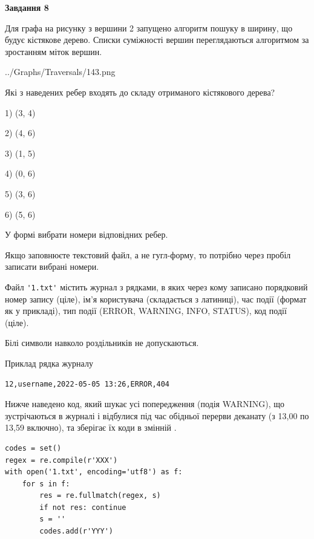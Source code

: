 \documentclass[12pt, ukrainian]{article}
\def\code#1{\Verb!#1!}
\begin{document}
{\begin {large}
{\begin {center}\textbf{Завдання 8}\end {center}}\par
Для графа на рисунку з вершини 2 запущено алгоритм пошуку в ширину, що будує кістякове дерево. Списки суміжності вершин переглядаються алгоритмом за зростанням міток вершин.\par
\begin{center}
	{../Graphs/Traversals/143.png}
\end{center}
\par Які з наведених ребер входять до складу отриманого кістякового дерева?\par
1) (3, 4)\par
2) (4, 6)\par
3) (1, 5)\par
4) (0, 6)\par
5) (3, 6)\par
6) (5, 6)\par
{\vskip 15pt} У формі вибрати номери відповідних ребер.


Якщо заповнюєте текстовий файл, а не гугл-форму, то потрібно через пробіл записа\-ти вибрані номери.\par
\newpage


Файл \code{'1.txt'} містить журнал з рядками, в яких через кому записано поряд\-ко\-вий номер запису (ціле), ім'я користувача (складається з латиниці), час події (фор\-мат як у прикладі), тип події (ERROR, WARNING, INFO, STATUS), код події (ціле).

Білі символи навколо роздільників не допускаються.

Приклад рядка журналу



\begin{verbatim}
12,username,2022-05-05 13:26,ERROR,404
\end{verbatim}


Нижче наведено код, який шукає усі попередження (подія WARNING), що зустрі\-ча\-ються в журналі і відбулися під час обідньої перерви деканату (з 13,00 по 13,59 включно), та зберігає їх коди в змінній .



\begin{verbatim}
codes = set()
regex = re.compile(r'XXX')
with open('1.txt', encoding='utf8') as f:
    for s in f:
        res = re.fullmatch(regex, s)
        if not res: continue
        s = ''
        codes.add(r'YYY')
\end{verbatim}





\end{large}}
\end{document}
